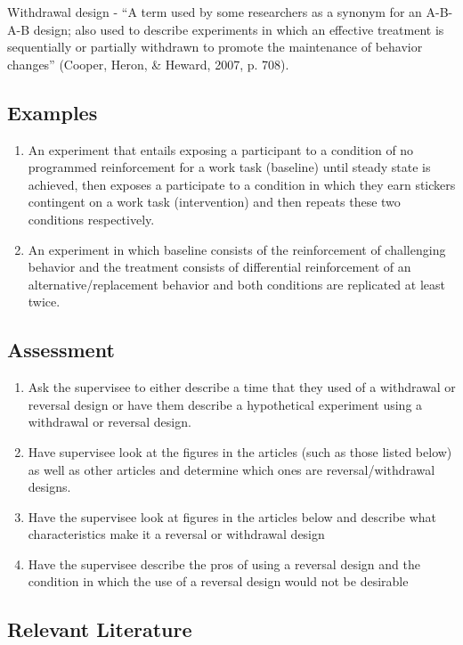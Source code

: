 Withdrawal design - ``A term used by some researchers as a synonym for an A-B-A-B design; also used to describe experiments in which an effective treatment is sequentially or partially withdrawn to promote the maintenance of behavior changes'' (Cooper, Heron, \& Heward, 2007, p. 708).
%
\subsection{Examples}
\begin{enumerate}
\item An experiment that entails exposing a participant to a condition of no programmed reinforcement for a work task (baseline) until steady state is achieved, then exposes a participate to a condition in which they earn stickers contingent on a work task (intervention) and then repeats these two conditions respectively. 
\item An experiment in which baseline consists of the reinforcement of challenging behavior and the treatment consists of differential reinforcement of an alternative/replacement behavior and both conditions are replicated at least twice. 
\end{enumerate}
%
\subsection{Assessment}
\begin{enumerate}
\item  Ask the supervisee to either describe a time that they used of a withdrawal or reversal design or have them describe a hypothetical experiment using a withdrawal or reversal design. 
\item Have supervisee look at the figures in the articles (such as those listed below) as well as other articles and determine which ones are reversal/withdrawal designs. 
\item Have the supervisee look at figures in the articles below and describe what characteristics make it a reversal or withdrawal design
\item Have the supervisee describe the pros of using a reversal design and the condition in which the use of a reversal design would not be desirable
\end{enumerate}
%
\subsection{Relevant Literature}
\begin{refsection}
\nocite{cooper2007applied,
    anderson2002use,
    baer1970recent,
    falcomata2004evaluation,
    lerman2002reinforcement}
\printbibliography[heading=none]
\end{refsection}
%
